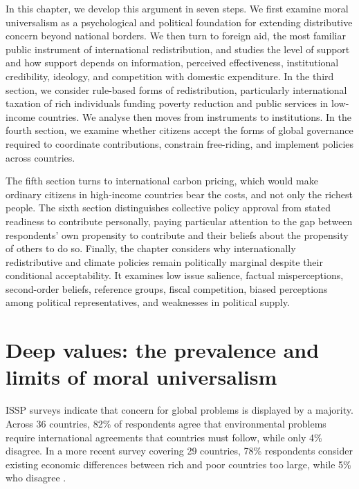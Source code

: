 \documentclass[11pt,a4paper]{article}
\begin{document}
In this chapter, we develop this argument in seven steps. We first examine moral universalism as a psychological and political foundation for extending distributive concern beyond national borders. We then turn to foreign aid, the most familiar public instrument of international redistribution, and studies 
the level of support and how support depends on information, perceived effectiveness, institutional credibility, ideology, and competition with domestic expenditure. In the third section, we consider rule-based forms of redistribution, particularly international taxation of rich individuals funding poverty reduction and public services in low-income countries.
We analyse then moves from instruments to institutions. In the fourth section, we examine whether citizens accept the forms of global governance required to coordinate contributions, constrain free-riding, and implement policies across countries. 

The fifth section turns to international carbon pricing, which would make ordinary citizens in high-income countries bear the costs, and not only the richest people. The sixth section distinguishes collective policy approval from stated readiness to contribute personally, paying particular attention to the gap between respondents’ own propensity to contribute and their beliefs about the propensity of others to do so. 
Finally, the chapter considers why internationally redistributive and climate policies remain politically marginal despite their conditional acceptability. It examines low issue salience, factual misperceptions, second-order beliefs, reference groups, fiscal competition, biased perceptions among political representatives, and weaknesses in political supply.

\section{Deep values: the prevalence and limits of moral universalism}

ISSP surveys indicate that concern for global problems is displayed by a majority. Across 36 countries, 82\% of respondents agree that environmental problems require international agreements that countries must follow, while only 4\% disagree. In a more recent survey covering 29 countries, 78\% respondents consider existing economic differences between rich and poor countries too large, while 5\% who disagree \citep{issp_environment_2010,issp_inequality_2019}. 
\end{document}
